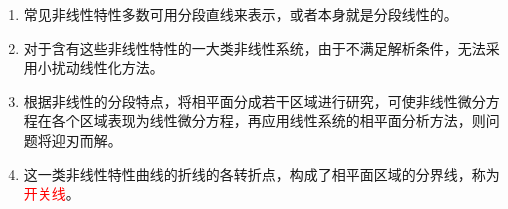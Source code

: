\begin{enumerate}
\begin{itemize}
        \item 收敛于该极限环，则极限环称为稳定极限环。系统呈现稳定的自振。
        \item 一些复杂的非线性控制系统可能出现两个或两个以上极限环。
        \item 该非线性系统的工作状态，不仅取决于初始条件，也取决于扰动大小。
        \item 只有稳定的极限环才能在实验中被观察到。不稳定或半稳定的极限环无法在实验中观察到
    \end{itemize}
    \item 常见非线性特性多数可用分段直线来表示，或者本身就是分段线性的。
    \item 对于含有这些非线性特性的一大类非线性系统，由于不满足解析条件，无法采用小扰动线性化方法。
    \item 根据非线性的分段特点，将相平面分成若干区域进行研究，可使非线性微分方程在各个区域表现为线性微分方程，再应用线性系统的相平面分析方法，则问题将迎刃而解。
    \item 这一类非线性特性曲线的折线的各转折点，构成了相平面区域的分界线，称为\textcolor{red}{开关线}。
\end{enumerate}

